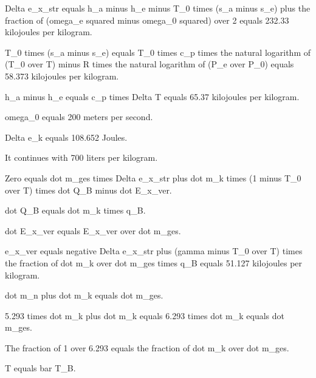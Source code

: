 Delta e_x_str equals h_a minus h_e minus T_0 times (s_a minus s_e) plus the fraction of (omega_e squared minus omega_0 squared) over 2 equals 232.33 kilojoules per kilogram.

T_0 times (s_a minus s_e) equals T_0 times c_p times the natural logarithm of (T_0 over T) minus R times the natural logarithm of (P_e over P_0) equals 58.373 kilojoules per kilogram.

h_a minus h_e equals c_p times Delta T equals 65.37 kilojoules per kilogram.

omega_0 equals 200 meters per second.

Delta e_k equals 108.652 Joules.

It continues with 700 liters per kilogram.

Zero equals dot m_ges times Delta e_x_str plus dot m_k times (1 minus T_0 over T) times dot Q_B minus dot E_x_ver.

dot Q_B equals dot m_k times q_B.

dot E_x_ver equals E_x_ver over dot m_ges.

e_x_ver equals negative Delta e_x_str plus (gamma minus T_0 over T) times the fraction of dot m_k over dot m_ges times q_B equals 51.127 kilojoules per kilogram.

dot m_n plus dot m_k equals dot m_ges.

5.293 times dot m_k plus dot m_k equals 6.293 times dot m_k equals dot m_ges.

The fraction of 1 over 6.293 equals the fraction of dot m_k over dot m_ges.

T equals bar T_B.
